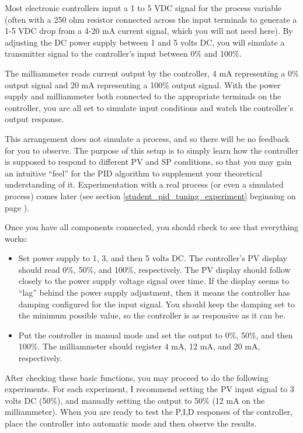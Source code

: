 Most electronic controllers input a 1 to 5 VDC signal for the process variable (often with a 250 ohm resistor connected across the input terminals to generate a 1-5 VDC drop from a 4-20 mA current signal, which you will not need here).  By adjusting the DC power supply between 1 and 5 volts DC, you will simulate a transmitter signal to the controller's input between 0\% and 100\%.

The milliammeter reads current output by the controller, 4 mA representing a 0\% output signal and 20 mA representing a 100\% output signal.  With the power supply and milliammeter both connected to the appropriate terminals on the controller, you are all set to simulate input conditions and watch the controller's output response.

This arrangement does not simulate a process, and so there will be no feedback for you to observe.  The purpose of this setup is to simply learn how the controller is supposed to respond to different PV and SP conditions, so that you may gain an intuitive ``feel'' for the PID algorithm to supplement your theoretical understanding of it.  Experimentation with a real process (or even a simulated process) comes later (see section \ref{student_pid_tuning_experiment} beginning on page \pageref{student_pid_tuning_experiment}).

\filbreak

Once you have all components connected, you should check to see that everything works:

\begin{itemize}
\item Set power supply to 1, 3, and then 5 volts DC.  The controller's PV display should read 0\%, 50\%, and 100\%, respectively.  The PV display should follow closely to the power supply voltage signal over time.  If the display seems to ``lag'' behind the power supply adjustment, then it means the controller has damping configured for the input signal.  You should keep the damping set to the minimum possible value, so the controller is as responsive as it can be.
\item Put the controller in manual mode and set the output to 0\%, 50\%, and then 100\%.  The milliammeter should register 4 mA, 12 mA, and 20 mA, respectively.
\end{itemize}

After checking these basic functions, you may proceed to do the following experiments.  For each experiment, I recommend setting the PV input signal to 3 volts DC (50\%), and manually setting the output to 50\% (12 mA on the milliammeter).  When you are ready to test the P,I,D responses of the controller, place the controller into automatic mode and then observe the results.








